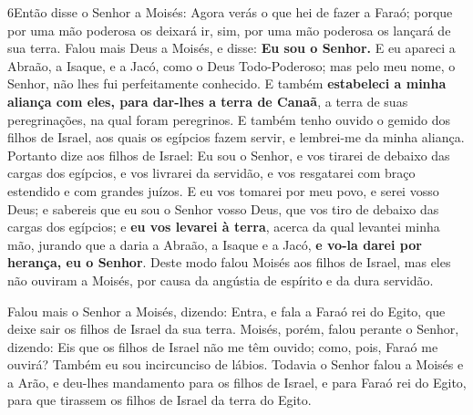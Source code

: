 \medskip

\lettrine{6} Então disse o Senhor a Moisés: Agora verás o que
hei de fazer a Faraó; porque por uma mão poderosa os deixará ir,
sim, por uma mão poderosa os lançará de sua terra. Falou mais
Deus a Moisés, e disse: \textbf{Eu sou o Senhor.} E eu apareci a
Abraão, a Isaque, e a Jacó, como o Deus Todo-Poderoso; mas pelo meu
nome, o Senhor, não lhes fui perfeitamente conhecido. E também
\textbf{estabeleci a minha aliança com eles, para dar-lhes a terra
de Canaã}, a terra de suas peregrinações, na qual foram peregrinos.
E também tenho ouvido o gemido dos filhos de Israel, aos quais
os egípcios fazem servir, e lembrei-me da minha aliança.
Portanto dize aos filhos de Israel: Eu sou o Senhor, e vos
tirarei de debaixo das cargas dos egípcios, e vos livrarei da
servidão, e vos resgatarei com braço estendido e com grandes juízos.
E eu vos tomarei por meu povo, e serei vosso Deus; e sabereis
que eu sou o Senhor vosso Deus, que vos tiro de debaixo das cargas
dos egípcios; e \textbf{eu vos levarei à terra}, acerca da qual
levantei minha mão, jurando que a daria a Abraão, a Isaque e a Jacó,
\textbf{e vo-la darei por herança, eu o Senhor}. Deste modo
falou Moisés aos filhos de Israel, mas eles não ouviram a Moisés,
por causa da angústia de espírito e da dura servidão.

Falou mais o Senhor a Moisés, dizendo: Entra, e fala a
Faraó rei do Egito, que deixe sair os filhos de Israel da sua terra.
Moisés, porém, falou perante o Senhor, dizendo: Eis que os
filhos de Israel não me têm ouvido; como, pois, Faraó me ouvirá?
Também eu sou incircunciso de lábios. Todavia o Senhor falou
a Moisés e a Arão, e deu-lhes mandamento para os filhos de Israel, e
para Faraó rei do Egito, para que tirassem os filhos de Israel da
terra do Egito.

